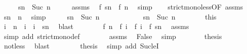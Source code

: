 \begin{isabellebody}
\ \ \ \ \ {\isacartoucheopen}sn\ {\isacharequal}\ Suc\ n{\isacartoucheclose}\isanewline
%
\isadelimproof
%
\endisadelimproof
%
\isatagproof
{}\isamarkupfalse%
\ {\isacharminus}\isanewline
\ \ \isamarkupfalse%
\ assms{\isacharparenleft}{}{\isacharparenright}\ \isamarkupfalse%
\ {\isacartoucheopen}f\ sn\ {\isachargreater}\ f\ n{\isacartoucheclose}\ \isamarkupfalse%
\ simp\isanewline
\ \ \isamarkupfalse%
\ strict{\isacharunderscore}mono{\isacharunderscore}less{\isacharbrackleft}OF\ assms{\isacharparenleft}{}{\isacharparenright}{\isacharbrackright}\ \isamarkupfalse%
\ {\isacartoucheopen}sn\ {\isachargreater}\ n{\isacartoucheclose}\ \isamarkupfalse%
\ simp\isanewline
\ \ \isamarkupfalse%
\ \isamarkupfalse%
\ {\isacartoucheopen}sn\ {\isasymle}\ Suc\ n{\isacartoucheclose}\isanewline
\ \ \isamarkupfalse%
\ {\isacharminus}\isanewline
\ \ \ \ \isacommand{{\isacharbraceleft}}\isamarkupfalse%
\ \isamarkupfalse%
\ {\isacartoucheopen}sn\ {\isachargreater}\ Suc\ n{\isacartoucheclose}\isanewline
\ \ \ \ \ \ \isamarkupfalse%
\ this\ \isamarkupfalse%
\ i\ \ {\isacartoucheopen}n\ {\isacharless}\ i\ {\isasymand}\ i\ {\isacharless}\ sn{\isacartoucheclose}\ \isamarkupfalse%
\ blast\isanewline
\ \ \ \ \ \ \isamarkupfalse%
\ {\isacartoucheopen}f\ n\ {\isacharless}\ f\ i\ {\isasymand}\ f\ i\ {\isacharless}\ f\ sn{\isacartoucheclose}\ \isamarkupfalse%
\ assms{\isacharparenleft}{}{\isacharparenright}\ \isamarkupfalse%
\ {\isacharparenleft}simp\ add{\isacharcolon}\ strict{\isacharunderscore}mono{\isacharunderscore}def{\isacharparenright}\isanewline
\ \ \ \ \ \ \isamarkupfalse%
\ assms{\isacharparenleft}{}{\isacharparenright}\ \isamarkupfalse%
\ False\ \isamarkupfalse%
\ simp\isanewline
\ \ \ \ \isacommand{{\isacharbraceright}}\isamarkupfalse%
\ \isamarkupfalse%
\ {\isacharquery}thesis\ \isamarkupfalse%
\ not{\isacharunderscore}less\ \isamarkupfalse%
\ blast\isanewline
\ \ \isamarkupfalse%
\isanewline
\ \ \isamarkupfalse%
\ \isamarkupfalse%
\ {\isacharquery}thesis\ \isamarkupfalse%
\ {\isacharparenleft}simp\ add{\isacharcolon}\ Suc{\isacharunderscore}leI{\isacharparenright}\isanewline

\end{isabellebody}

